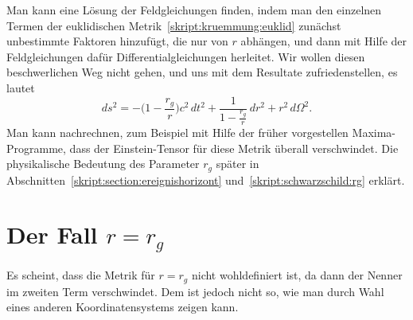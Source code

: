 Man kann eine Lösung der Feldgleichungen finden, indem man den
einzelnen Termen der euklidischen Metrik~\eqref{skript:kruemmung:euklid}
zunächst unbestimmte Faktoren hinzufügt, die nur von $r$ abhängen,
und dann mit Hilfe der Feldgleichungen dafür Differentialgleichungen
herleitet.
Wir wollen diesen beschwerlichen Weg nicht gehen, und uns mit dem
Resultate zufriedenstellen, es lautet
\begin{equation}
ds^2
=
-\biggl(1-\frac{r_g}r\biggr)c^2\,dt^2
+\frac1{\displaystyle 1-\frac{r_g}r}\,dr^2 + r^2\,d\Omega^2.
\label{skript:kruemmung:schwarzschildmetrik}
\end{equation}
Man kann nachrechnen, zum Beispiel mit Hilfe der früher vorgestellen
Maxima-Programme, dass der Einstein-Tensor für diese Metrik überall
verschwindet.
Die physikalische Bedeutung des Parameter $r_g$ später in
Abschnitten~\ref{skript:section:ereignishorizont}
und~\ref{skript:schwarzschild:rg} erklärt.

\section{Der Fall $r=r_g$}
Es scheint, dass die Metrik für $r=r_g$ nicht wohldefiniert ist,
da dann der Nenner im zweiten Term verschwindet.
Dem ist jedoch nicht so, wie man durch Wahl eines anderen Koordinatensystems
zeigen kann.

